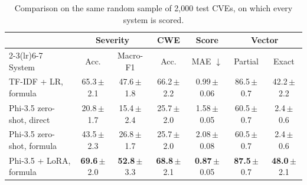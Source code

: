 \begin{table}[t]
\centering
\caption{Comparison on the same random sample of 2{,}000 test CVEs, on which every system is scored.}
\label{tab:subset}
\small
\setlength{\tabcolsep}{4pt}
\begin{tabular}{lcccccc}
\toprule
 & \multicolumn{2}{c}{Severity} & CWE & Score & \multicolumn{2}{c}{Vector} \\
\cmidrule(lr){2-3}\cmidrule(lr){6-7}
System & Acc. & Macro-F1 & Acc. & MAE $\downarrow$ & Partial & Exact \\
\midrule
TF-IDF + LR, formula & 65.3\,{\scriptsize$\pm$2.1} & 47.6\,{\scriptsize$\pm$1.8} & 66.2\,{\scriptsize$\pm$2.2} & 0.99\,{\scriptsize$\pm$0.06} & 86.5\,{\scriptsize$\pm$0.7} & 42.2\,{\scriptsize$\pm$2.2} \\
Phi-3.5 zero-shot, direct & 20.8\,{\scriptsize$\pm$1.7} & 15.4\,{\scriptsize$\pm$2.4} & 25.7\,{\scriptsize$\pm$2.0} & 1.58\,{\scriptsize$\pm$0.05} & 60.5\,{\scriptsize$\pm$0.7} & 2.4\,{\scriptsize$\pm$0.6} \\
Phi-3.5 zero-shot, formula & 43.5\,{\scriptsize$\pm$2.3} & 26.8\,{\scriptsize$\pm$1.7} & 25.7\,{\scriptsize$\pm$2.0} & 2.08\,{\scriptsize$\pm$0.08} & 60.5\,{\scriptsize$\pm$0.7} & 2.4\,{\scriptsize$\pm$0.6} \\
Phi-3.5 + LoRA, formula & \textbf{69.6}\,{\scriptsize$\pm$2.0} & \textbf{52.8}\,{\scriptsize$\pm$3.3} & \textbf{68.8}\,{\scriptsize$\pm$2.1} & \textbf{0.87}\,{\scriptsize$\pm$0.05} & \textbf{87.5}\,{\scriptsize$\pm$0.7} & \textbf{48.0}\,{\scriptsize$\pm$2.1} \\
\bottomrule
\end{tabular}
\end{table}
